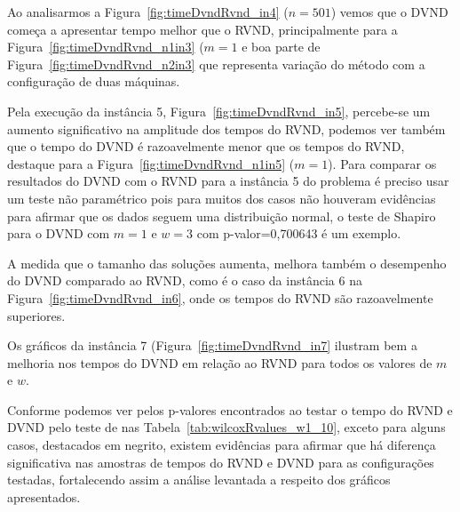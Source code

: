 
Ao analisarmos a Figura~\ref{fig:timeDvndRvnd_in4} ($n=501$) vemos que o DVND começa a apresentar tempo melhor que o RVND, principalmente para a Figura~\ref{fig:timeDvndRvnd_n1in3} ($m=1$ e boa parte de Figura~\ref{fig:timeDvndRvnd_n2in3} que representa variação do método com a configuração de duas máquinas.


Pela execução da instância 5, Figura~\ref{fig:timeDvndRvnd_in5}, percebe-se um aumento significativo na amplitude dos tempos do RVND, podemos ver também que o tempo do DVND é razoavelmente menor que os tempos do RVND, destaque para a Figura~\ref{fig:timeDvndRvnd_n1in5} ($m=1$).
Para comparar os resultados do DVND com o RVND para a instância 5 do problema é preciso usar um teste não paramétrico pois para muitos dos casos não houveram evidências para afirmar que os dados seguem uma distribuição normal, o teste de Shapiro para o DVND com $m=1$ e $w=3$ com p-valor=0,700643 é um exemplo.


A medida que o tamanho das soluções aumenta, melhora também o desempenho do DVND comparado ao RVND, como é o caso da instância 6 na Figura~\ref{fig:timeDvndRvnd_in6}, onde os tempos do RVND são razoavelmente superiores.


Os gráficos da instância 7 (Figura~\ref{fig:timeDvndRvnd_in7} ilustram bem a melhoria nos tempos do DVND em relação ao RVND para todos os valores de $m$ e $w$.

Conforme podemos ver pelos p-valores encontrados ao testar o tempo do RVND e DVND pelo teste de nas Tabela~\ref{tab:wilcoxRvalues_w1_10}, exceto para alguns casos, destacados em negrito, existem evidências para afirmar que há diferença significativa nas amostras de tempos do RVND e DVND para as configurações testadas, fortalecendo assim a análise levantada a respeito dos gráficos apresentados.



